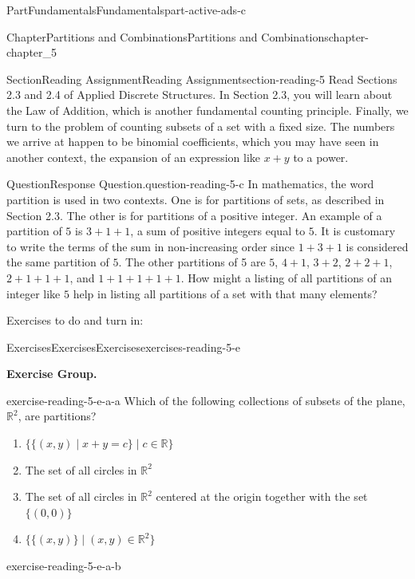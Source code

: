 \documentclass[oneside,10pt,]{book}
\numberwithin{equation}{section}
\begin{document}
\begin{partptx}{Part}{Fundamentals}{}{Fundamentals}{}{}{part-active-ads-c}
\begin{chapterptx}{Chapter}{Partitions and Combinations}{}{Partitions and Combinations}{}{}{chapter-chapter_5}
\begin{sectionptx}{Section}{Reading Assignment}{}{Reading Assignment}{}{}{section-reading-5}
Read Sections 2.3 and 2.4 of Applied Discrete Structures. In Section 2.3, you will learn about the Law of Addition, which is another fundamental counting principle.  Finally, we turn to the problem of counting subsets of a set with a fixed size.  The numbers we arrive at happen to be binomial coefficients, which you may have seen in another context, the expansion of an expression like \(x + y\) to a power.%
\begin{question}{Question}{Response Question.}{question-reading-5-c}%
In mathematics, the word partition is used in two contexts. One is for partitions of sets, as described in Section 2.3. The other is for partitions of a positive integer.  An example of a partition of \(5\) is \(3+1+1\), a sum of positive integers equal to \(5\). It is customary to write the terms of the sum in non-increasing order since \(1+3+1\) is considered the same partition of \(5\). The other partitions of 5 are \(5\), \(4+1\), \(3+2\), \(2+2+1\), \(2+1+1+1\), and \(1+1+1+1+1\). How might a listing of all partitions of an integer like \(5\) help in listing all partitions of a set with that many elements?%
\end{question}
Exercises to do and turn in:%
%
%
\typeout{************************************************}
\typeout{************************************************}
%
\begin{exercises-subsection-numberless}{Exercises}{Exercises}{}{Exercises}{}{}{exercises-reading-5-e}
\par\medskip\noindent%
\textbf{Exercise Group.}\space\space%
\begin{exercisegroup}
\begin{divisionexerciseeg}{1}{}{}{exercise-reading-5-e-a-a}%
Which of the following collections of subsets of the plane, \(\mathbb{R}^2\), are partitions?%
\begin{enumerate}[label=(\alph*)]
\item{}\(\displaystyle \{ \{(x, y) \mid x + y = c \} \mid c \in \mathbb{R} \}\)%
\item{}The set of all circles in \(\mathbb{R}^2 \)%
\item{}The set of all circles in \(\mathbb{R}^2\) centered at the origin together with the set \(\{(0,0)\}\)%
\item{}\(\displaystyle \{\{(x, y)\} \mid (x, y) \in \mathbb{R}^2  \} \)%
\end{enumerate}
%
\end{divisionexerciseeg}%
\begin{divisionexerciseeg}{2}{}{}{exercise-reading-5-e-a-b}%

\end{divisionexerciseeg}
\end{exercisegroup}
\end{exercises-subsection-numberless}
\end{sectionptx}
\end{chapterptx}
\end{partptx}
\end{document}
